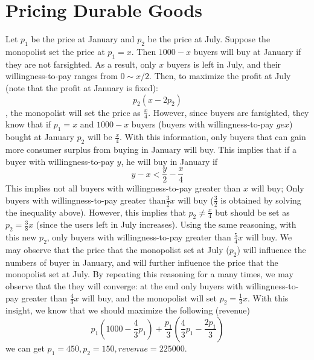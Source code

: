 \documentclass[a4paper]{article}
\begin{document}
    \section{Pricing Durable Goods}
    \begin{answer}[Q1]
    Let $p_1$ be the price at January and $p_2$ be the price at July. Suppose the monopolist set the price at $p_1=x$. Then $1000-x$ buyers will buy at January if they are not farsighted. As a result, only $x$ buyers is left in July, and their willingness-to-pay ranges from $0 \sim x/2$. Then, to maximize the profit at July (note that the profit at January is fixed):
    \[
        p_2(x - 2p_2)
    \]
    , the monopolist will set the price as $\frac{x}{4}$.
    \newline\newline
    However, since buyers are farsighted, they know that if $p_1=x$ and $1000-x$ buyers (buyers with willingness-to-pay $ge x$) bought at January $p_2$ will be $\frac{x}{4}$. With this information, only buyers that can gain more consumer surplus from buying in January will buy. This implies that if a buyer with willingness-to-pay $y$, he will buy in January if
    \[
        y - x < \frac{y}{2}-\frac{x}{4}
    \]
    This implies not all buyers with willingness-to-pay greater than $x$ will buy; Only buyers with willingness-to-pay greater than$\frac{3}{2}x$ will buy ($\frac{3}{2}$ is obtained by solving the inequality above).
    \newline\newline
    However, this implies that $p_2\neq\frac{x}{4}$ but should be set as $p_2=\frac{3}{8}x$ (since the users left in July increases). Using the same reasoning, with this new $p_2$, only buyers with willingness-to-pay greater than $\frac{5}{4}x$ will buy.
    \newline\newline
    We may observe that the price that the monopolist set at July ($p_2$) will influence the numbers of buyer in January, and will further influence the price that the monopolist set at July. By repeating this reasoning for a many times, we may observe that the they will converge: at the end only buyers with willingness-to-pay greater than $\frac{4}{3}x$ will buy, and the monopolist will set $p_2=\frac{1}{3}x$.
    \newline\newline
    With this insight, we know that we should maximize the following (revenue)
    \[
        p_1\left(1000-\frac{4}{3}p_1\right) + \frac{p_1}{3}\left(\frac{4}{3}p_1 - \frac{2p_1}{3}\right)
    \]
    we can get $p_1=450, p_2=150, revenue=225000$.
    
    \end{answer}
\end{document}
